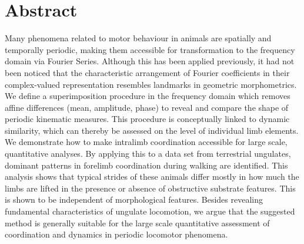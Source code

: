 

\clearpage
\section{Abstract}
Many phenomena related to motor behaviour in animals are spatially and temporally periodic, making them accessible for transformation to the frequency domain via Fourier Series.
Although this has been applied previously, it had not been noticed that the characteristic arrangement of Fourier coefficients in their complex-valued representation resembles landmarks in geometric morphometrics.
We define a superimposition procedure in the frequency domain which removes affine differences (mean, amplitude, phase) to reveal and compare the shape of periodic kinematic measures.
This procedure is conceptually linked to dynamic similarity, which can thereby be assessed on the level of individual limb elements.
We demonstrate how to make intralimb coordination accessible for large scale, quantitative analyses.
By applying this to a data set from terrestrial ungulates, dominant patterns in forelimb coordination during walking are identified.
This analysis shows that typical strides of these animals differ mostly in how much the limbs are lifted in the presence or absence of obstructive substrate features.
This is shown to be independent of morphological features.
Besides revealing fundamental characteristics of ungulate locomotion, we argue that the suggested method is generally suitable for the large scale quantitative assessment of coordination and dynamics in periodic locomotor phenomena.


\pagebreak
